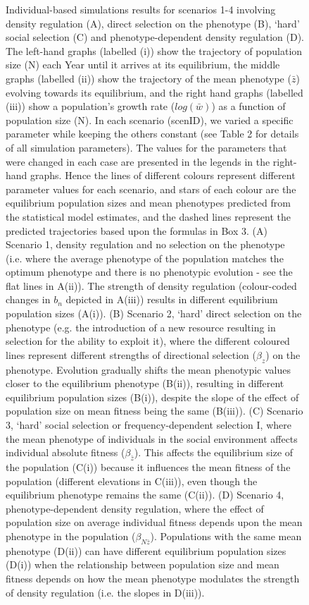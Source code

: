 \documentclass{article}
\begin{document}
\begin{figure} [H]
		\caption{Individual-based simulations results for scenarios 1-4 involving density regulation (A), direct selection on the phenotype (B), `hard' social selection (C) and phenotype-dependent density regulation (D). The left-hand graphs (labelled (i)) show the trajectory of population size (N) each Year until it arrives at its equilibrium, the middle graphs (labelled (ii)) show the trajectory of the mean phenotype ($\bar{z}$) evolving towards its equilibrium, and the right hand graphs (labelled (iii)) show a population's growth rate ($log(\bar{w})$) as a function of population size (N). In each scenario (scenID), we varied a specific parameter while keeping the others constant (see Table 2 for details of all simulation parameters). The values for the parameters that were changed in each case are presented in the legends in the right-hand graphs. Hence the lines of different colours represent different parameter values for each scenario, and stars of each colour are the equilibrium population sizes and mean phenotypes predicted from the statistical model estimates, and the dashed lines represent the predicted trajectories based upon the formulas in Box 3. (A) Scenario 1, density regulation and no selection on the phenotype (i.e. where the average phenotype of the population matches the optimum phenotype and there is no phenotypic evolution - see the flat lines in A(ii)). The strength of density regulation (colour-coded changes in $b_n$ depicted in A(iii)) results in different equilibrium population sizes (A(i)). (B) Scenario 2, `hard' direct selection on the phenotype (e.g. the introduction of a new resource resulting in selection for the ability to exploit it), where the different coloured lines represent different strengths of directional selection ($\beta_{{z}}$) on the phenotype. Evolution gradually shifts the mean phenotypic values closer to the equilibrium phenotype (B(ii)), resulting in different equilibrium population sizes (B(i)), despite the slope of the effect of population size on mean fitness being the same (B(iii)). (C) Scenario 3, `hard' social selection or frequency-dependent selection I, where the mean phenotype of individuals in the social environment affects individual absolute fitness ($\beta_{\bar{z}}$). This affects the equilibrium size of the population (C(i)) because it influences the mean fitness of the population (different elevations in C(iii)), even though the equilibrium phenotype remains the same (C(ii)). (D) Scenario 4, phenotype-dependent density regulation, where the effect of population size on average individual fitness depends upon the mean phenotype in the population ($\beta_{{N\bar{z}}}$). Populations with the same mean phenotype (D(ii)) can have different equilibrium population sizes (D(i)) when the relationship between population size and mean fitness depends on how the mean phenotype modulates the strength of density regulation (i.e. the slopes in D(iii)).}
		\label{fig:sim2}
	\end{figure}
	
\end{document}
